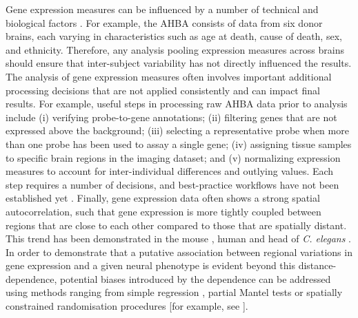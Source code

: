 Gene expression measures can be influenced by a number of technical and biological factors \citep{Fraser2005,Berchtold2008,Kumar2013,Trabzuni2013}.
For example, the AHBA consists of data from six donor brains, each varying in characteristics such as age at death, cause of death, sex, and ethnicity. Therefore, any analysis pooling expression measures across brains should ensure that inter-subject variability has not directly influenced the results. The analysis of gene expression measures often involves important additional processing decisions that are not applied consistently and can impact final results. For example, useful steps in processing raw AHBA data prior to analysis include (i) verifying probe-to-gene annotations; (ii) filtering genes that are not expressed above the background; (iii) selecting a representative probe when more than one probe has been used to assay a single gene; (iv) assigning tissue samples to specific brain regions in the imaging dataset; and (v) normalizing expression measures to account for inter-individual differences and outlying values. Each step requires a number of decisions, and best-practice workflows have not been established yet \citep{Arnatkeviciute2019}.
Finally, gene expression data often shows a strong spatial autocorrelation, such that gene expression is more tightly coupled between regions that are close to each other compared to those that are spatially distant. This trend has been demonstrated in the mouse \citep{Fulcher2016}, human \citep{Richiardi2015,Krienen2016,Pantazatos2017,Vertes2016b,Arnatkeviciute2019} and head of \textit{C. elegans} \citep{Arnatkeviciute2018}.
In order to demonstrate that a putative association between regional variations in gene expression and a given neural phenotype is evident beyond this distance-dependence, potential biases introduced by the dependence can be addressed using methods ranging from simple regression \citep{Fulcher2016}, partial Mantel tests \citep{French2011,Ji2014,Fakhry2015} or spatially constrained randomisation procedures [for example, see \citep{Vertes2016b,Burt2017,Seidlitz2018,Arnatkeviciute2019}].

